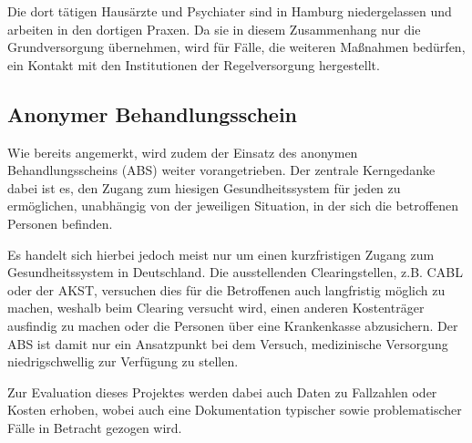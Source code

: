 Die dort tätigen Hausärzte und Psychiater sind in Hamburg niedergelassen und arbeiten in den dortigen Praxen. Da sie in diesem Zusammenhang nur die Grundversorgung übernehmen, wird für Fälle, die weiteren Maßnahmen bedürfen, ein Kontakt mit den Institutionen der Regelversorgung hergestellt. \citep{Leeden.2023}

\subsection{Anonymer Behandlungsschein}

Wie bereits angemerkt, wird zudem der Einsatz des anonymen Behandlungsscheins (\acs{ABS}) weiter vorangetrieben. Der zentrale Kerngedanke dabei ist es, den Zugang zum hiesigen Gesundheitssystem für jeden zu ermöglichen, unabhängig von der jeweiligen Situation, in der sich die betroffenen Personen befinden. 

Es handelt sich hierbei jedoch meist nur um einen kurzfristigen Zugang zum Gesundheitssystem in Deutschland. Die ausstellenden Clearingstellen, z.B. \ac{CABL} oder der \ac{AKST}, versuchen dies für die Betroffenen auch langfristig möglich zu machen, weshalb beim Clearing versucht wird, einen anderen Kostenträger ausfindig zu machen oder die Personen über eine Krankenkasse abzusichern. Der \acs{ABS} ist damit nur ein Ansatzpunkt bei dem Versuch, medizinische Versorgung niedrigschwellig zur Verfügung zu stellen.

Zur Evaluation dieses Projektes werden dabei auch Daten zu Fallzahlen oder Kosten erhoben, wobei auch eine Dokumentation typischer sowie problematischer Fälle in Betracht gezogen wird. \citep{Zanders.2022}